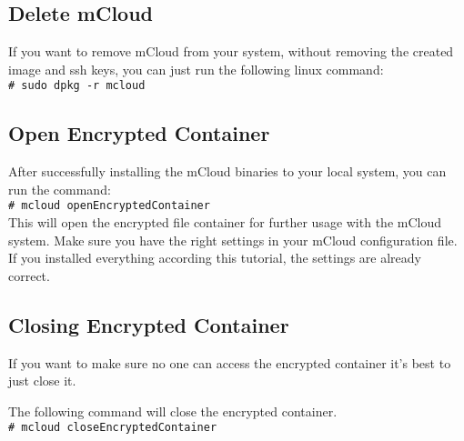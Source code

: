 \documentclass{article}
\newcommand{\shellcmd}[1]{\\\indent\indent\texttt{\footnotesize\# #1}\\}
\begin{document}
\newpage

\subsection{Delete mCloud}

If you want to remove mCloud from your system, without removing the created image and ssh keys, you can just run the following linux command:
\shellcmd{sudo dpkg -r mcloud}


\subsection{Open Encrypted Container}

After successfully installing the mCloud binaries to your local system, you can run the command:
\shellcmd{mcloud openEncryptedContainer}
This will open the encrypted file container for further usage with the mCloud system. Make sure you have the right settings in your mCloud configuration file. If you installed everything according this tutorial, the settings are already correct.

\subsection{Closing Encrypted Container}
If you want to make sure no one can access the encrypted container it's best to just close it. 

The following command will close the encrypted container.
\shellcmd{mcloud closeEncryptedContainer}
\end{document}
